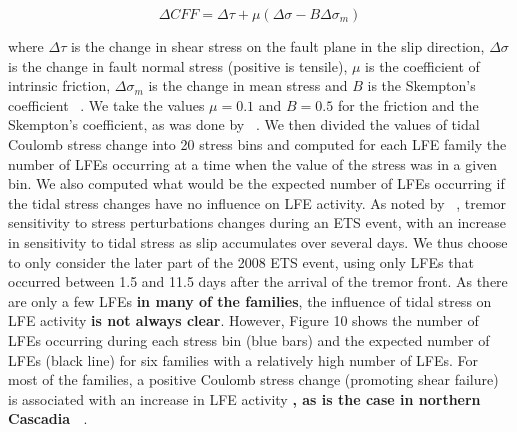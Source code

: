 \documentclass[draft]{agujournal2019}
\begin{document}
\begin{linenomath*}
\begin{equation}
\Delta CFF = \Delta \tau + \mu \left( \Delta \sigma - B \Delta \sigma_m \right)
\end{equation}
\end{linenomath*}

where $\Delta \tau$ is the change in shear stress on the fault plane in the slip direction, $\Delta \sigma$ is the change in fault normal stress (positive is tensile), $\mu$ is the coefficient of intrinsic friction, $\Delta \sigma_m$ is the change in mean stress and $B$ is the Skempton's coefficient ~\cite{HOU_2015}. We take the values $\mu = 0.1$ and $B = 0.5$ for the friction and the Skempton's coefficient, as was done by ~. We then divided the values of tidal Coulomb stress change into 20 stress bins and computed for each LFE family the number of LFEs occurring at a time when the value of the stress was in a given bin. We also computed what would be the expected number of LFEs occurring if the tidal stress changes have no influence on LFE activity. As noted by ~, tremor sensitivity to stress perturbations changes during an ETS event, with an increase in sensitivity to tidal stress as slip accumulates over several days. We thus choose to only consider the later part of the 2008 ETS event, using only LFEs that occurred between 1.5 and 11.5 days after the arrival of the tremor front. As there are only a few LFEs \textbf{in many of the families}, the influence of tidal stress on LFE activity \textbf{is not always clear}. However, Figure 10 shows the number of LFEs occurring during each stress bin (blue bars) and the expected number of LFEs (black line) for six families with a relatively high number of LFEs. For most of the families, a positive Coulomb stress change (promoting shear failure) is associated with an increase in LFE activity \textbf{, as is the case in northern Cascadia ~\cite{HOU_2015}}. \\
\end{document}
